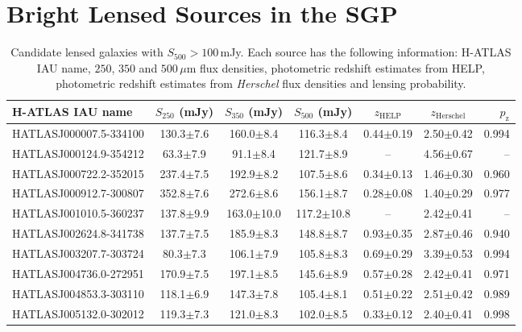\chapter{Bright Lensed Sources in the SGP}
\begin{landscape}

\begin{longtable}[h!]{lcccccr}

    \caption[Candidate lensed galaxies with $S_{500} > 100\,$mJy]{Candidate lensed galaxies with $S_{500} > 100\,$mJy. Each source has the following information: H-ATLAS IAU name, $250$, $350$ and $500\,\mu$m flux densities, photometric redshift estimates from HELP, photometric redshift estimates from \textit{Herschel} flux densities and lensing probability.} 
    \label{tab:SLG_candidates} \\
    \hline
    \hline
    H-ATLAS IAU name & $S_{250}$ (mJy) & $S_{350}$ (mJy) & $S_{500}$ (mJy) & $z_{\textrm{HELP}}$ & $z_{\textrm{Herschel}}$ & $p_{\textrm{z}}$ \\
    \hline
    \hline
    HATLASJ000007.5-334100 & 130.3$\pm$7.6 & 160.0$\pm$8.4 & 116.3$\pm$8.4 & 0.44$\pm$0.19 & 2.50$\pm$0.42 & 0.994 \\
    HATLASJ000124.9-354212 & 63.3$\pm$7.9 & 91.1$\pm$8.4 & 121.7$\pm$8.9 & -- & 4.56$\pm$0.67 & -- \\
    HATLASJ000722.2-352015 & 237.4$\pm$7.5 & 192.9$\pm$8.2 & 107.5$\pm$8.6 & 0.34$\pm$0.13 & 1.46$\pm$0.30 & 0.960 \\
    HATLASJ000912.7-300807 & 352.8$\pm$7.6 & 272.6$\pm$8.6 & 156.1$\pm$8.7 & 0.28$\pm$0.08 & 1.40$\pm$0.29 & 0.977 \\
    HATLASJ001010.5-360237 & 137.8$\pm$9.9 & 163.0$\pm$10.0 & 117.2$\pm$10.8 & -- & 2.42$\pm$0.41 & -- \\
    HATLASJ002624.8-341738 & 137.7$\pm$7.5 & 185.9$\pm$8.3 & 148.8$\pm$8.7 & 0.93$\pm$0.35 & 2.87$\pm$0.46 & 0.940 \\
    HATLASJ003207.7-303724 & 80.3$\pm$7.3 & 106.1$\pm$7.9 & 105.8$\pm$8.3 & 0.69$\pm$0.29 & 3.39$\pm$0.53 & 0.994 \\ 
    HATLASJ004736.0-272951 & 170.9$\pm$7.5 & 197.1$\pm$8.5 & 145.6$\pm$8.9 & 0.57$\pm$0.28 & 2.42$\pm$0.41 & 0.971 \\ 
    HATLASJ004853.3-303110 & 118.1$\pm$6.9 & 147.3$\pm$7.8 & 105.4$\pm$8.1 & 0.51$\pm$0.22 & 2.51$\pm$0.42 & 0.989 \\ 
    HATLASJ005132.0-302012 & 119.3$\pm$7.3 & 121.0$\pm$8.3 & 102.0$\pm$8.5 & 0.33$\pm$0.12 & 2.40$\pm$0.41 & 0.998 \\

\end{longtable}
\end{landscape}
